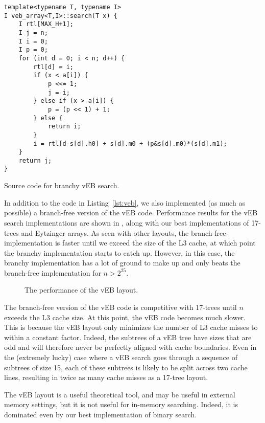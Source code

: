 \documentclass{patmorin}
\newcommand{\lstlabel}[1]{\label{lst:#1}}
\newcommand{\lstref}[1]{Listing~\ref{lst:#1}}
\begin{document}
\begin{listing}
\begin{verbatim}
template<typename T, typename I>
I veb_array<T,I>::search(T x) {
    I rtl[MAX_H+1];
    I j = n;
    I i = 0;
    I p = 0;
    for (int d = 0; i < n; d++) {
        rtl[d] = i;
        if (x < a[i]) {
            p <<= 1;
            j = i;
        } else if (x > a[i]) {
            p = (p << 1) + 1;
        } else {
            return i;
        }
        i = rtl[d-s[d].h0] + s[d].m0 + (p&s[d].m0)*(s[d].m1);
    }
    return j;
}
\end{verbatim}
\caption{Source code for branchy vEB search.}
\lstlabel{veb}
\end{listing}

In addition to the code in \lstref{veb}, we also implemented (as much as
possible) a branch-free version of the vEB code.  Performance results for
the vEB search implementations are shown in , along with our
best implementations of 17-trees and Eytzinger arrays.  As seen with other
layouts, the branch-free implementation is faster until we exceed the size
of the L3 cache, at which point the branchy implementation starts to catch
up. However, in this case, the branchy implementation has a lot of ground
to make up and only beats the branch-free implementation for $n>2^{25}$.

\begin{figure}
   \caption{The performance of the vEB layout.}
\end{figure}

The branch-free version of the vEB code is competitive with 17-trees
until $n$ exceeds the L3 cache size.  At this point, the vEB code becomes
much slower.  This is because the vEB layout only minimizes the number
of L3 cache misses to within a constant factor.  Indeed, the subtrees
of a vEB tree have sizes that are odd and will therefore never be
perfectly aligned with cache boundaries.  Even in the (extremely lucky)
case where a vEB search goes through a sequence of subtrees of size 15,
each of these subtrees is likely to be split across two cache lines,
resulting in twice as many cache misses as a 17-tree layout.

\begin{lesson}
  The vEB layout is a useful theoretical tool, and may be useful in
  external memory settings, but it is not useful for in-memory searching.
  Indeed, it is dominated even by our best implementation of binary
  search.
\end{lesson}
\end{document}
